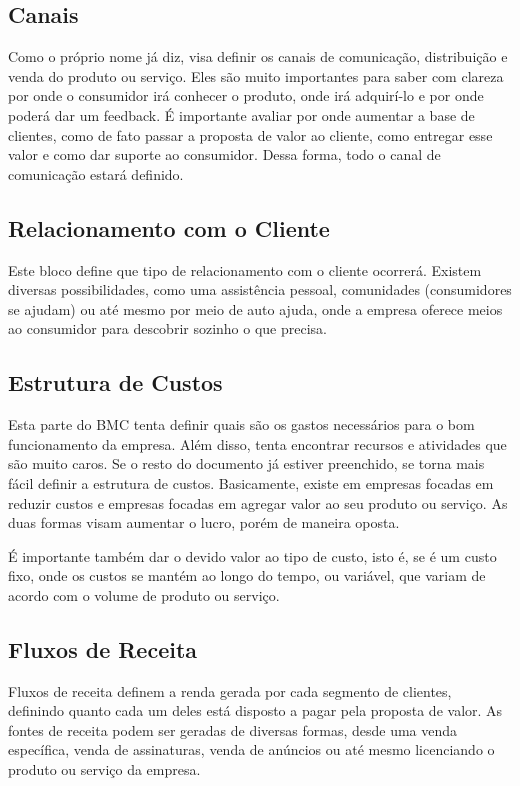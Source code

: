 \subsection{Canais}

Como o próprio nome já diz, visa definir os canais de comunicação, distribuição e venda do produto ou serviço. Eles são muito importantes para saber com clareza por onde o consumidor irá conhecer o produto, onde irá adquirí-lo e por onde poderá dar um feedback. É importante avaliar por onde aumentar a base de clientes, como de fato passar a proposta de valor ao cliente, como entregar esse valor e como dar suporte ao consumidor. Dessa forma, todo o canal de comunicação estará definido.

\subsection{Relacionamento com o Cliente}

Este bloco define que tipo de relacionamento com o cliente ocorrerá. Existem diversas possibilidades, como uma assistência pessoal, comunidades (consumidores se ajudam) ou até mesmo por meio de auto ajuda, onde a empresa oferece meios ao consumidor para descobrir sozinho o que precisa.

\subsection{Estrutura de Custos}

Esta parte do BMC tenta definir quais são os gastos necessários para o bom funcionamento da empresa. Além disso, tenta encontrar recursos e atividades que são muito caros. Se o resto do documento já estiver preenchido, se torna mais fácil definir a estrutura de custos. Basicamente, existe em empresas focadas em reduzir custos e empresas focadas em agregar valor ao seu produto ou serviço. As duas formas visam aumentar o lucro, porém de maneira oposta.

É importante também dar o devido valor ao tipo de custo, isto é, se é um custo fixo, onde os custos se mantém ao longo do tempo, ou variável, que variam de acordo com o volume de produto ou serviço.

\subsection{Fluxos de Receita}

Fluxos de receita definem a renda gerada por cada segmento de clientes, definindo quanto cada um deles está disposto a pagar pela proposta de valor. As fontes de receita podem ser geradas de diversas formas, desde uma venda específica, venda de assinaturas, venda de anúncios ou até mesmo licenciando o produto ou serviço da empresa.

